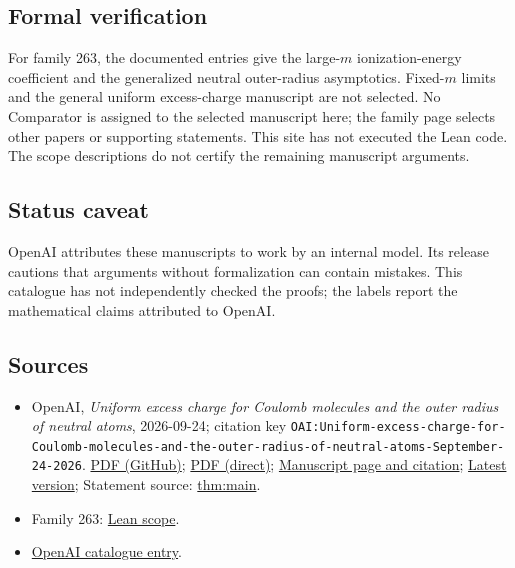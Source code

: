 \documentclass[11pt]{article}
\begin{document}
\subsection{Formal verification}
For family 263, the documented entries give the large-$m$ ionization-energy coefficient and the generalized neutral outer-radius asymptotics. Fixed-$m$ limits and the general uniform excess-charge manuscript are not selected. No Comparator is assigned to the selected manuscript here; the family page selects other papers or supporting statements. This site has not executed the Lean code. The scope descriptions do not certify the remaining manuscript arguments.

\subsection{Status caveat}
OpenAI attributes these manuscripts to work by an internal model. Its release cautions that arguments without formalization can contain mistakes. This catalogue has not independently checked the proofs; the labels report the mathematical claims attributed to OpenAI.

\subsection{Sources}
\begin{itemize}
\item OpenAI, \emph{Uniform excess charge for Coulomb molecules and the outer radius of neutral atoms}, 2026-09-24; citation key \texttt{OAI:Uniform-excess-charge-for-Coulomb-molecules-and-the-outer-radius-of-neutral-atoms-September-24-2026}. \href{https://github.com/openai/math/blob/adc7f1241b42e322a6451854ab7e4b4c146bf78a/preprints/Uniform-excess-charge-for-Coulomb-molecules-and-the-outer-radius-of-neutral-atoms-September-24-2026/paper.pdf}{PDF (GitHub)}; \href{https://github.com/openai/math/raw/adc7f1241b42e322a6451854ab7e4b4c146bf78a/preprints/Uniform-excess-charge-for-Coulomb-molecules-and-the-outer-radius-of-neutral-atoms-September-24-2026/paper.pdf}{PDF (direct)}; \href{https://github.com/openai/math/blob/adc7f1241b42e322a6451854ab7e4b4c146bf78a/preprints/Uniform-excess-charge-for-Coulomb-molecules-and-the-outer-radius-of-neutral-atoms-September-24-2026/README.md}{Manuscript page and citation}; \href{https://github.com/openai/math/blob/main/preprints/Uniform-excess-charge-for-Coulomb-molecules-and-the-outer-radius-of-neutral-atoms-September-24-2026/paper.pdf}{Latest version}; Statement source: \href{https://github.com/openai/math/blob/adc7f1241b42e322a6451854ab7e4b4c146bf78a/preprints/Uniform-excess-charge-for-Coulomb-molecules-and-the-outer-radius-of-neutral-atoms-September-24-2026/build/sections/01-introduction.tex\#L34}{thm:main}.
\item Family 263: \href{https://github.com/openai/math/blob/adc7f1241b42e322a6451854ab7e4b4c146bf78a/lean/docs/263.md}{Lean scope}.
\item \href{https://github.com/openai/math/blob/adc7f1241b42e322a6451854ab7e4b4c146bf78a/CONTENTS.md}{OpenAI catalogue entry}.
\end{itemize}
\end{document}
